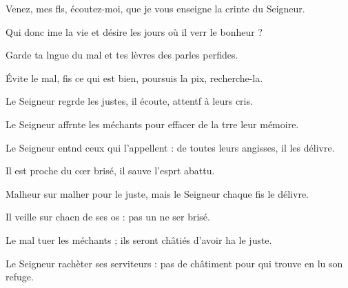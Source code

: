 \item Venez, mes fls, écoutez-moi,\psstar{} que je vous enseigne la crinte du Seigneur.
\item Qui donc ime la vie\psstar{} et désire les jours où il verr le bonheur ?
\item Garde ta lngue du mal\psstar{} et tes lèvres des parles perfides.
\item Évite le mal, fis ce qui est bien,\psstar{} poursuis la pix, recherche-la.
\item Le Seigneur regrde les justes,\psstar{} il écoute, attentf à leurs cris.
\item Le Seigneur affrnte les méchants\psstar{} pour effacer de la trre leur mémoire.
\item Le Seigneur entnd ceux qui l’appellent :\psstar{} de toutes leurs angisses, il les délivre.
\item Il est proche du cœr brisé,\psstar{} il sauve l’esprt abattu.
\item Malheur sur malher pour le juste,\psstar{} mais le Seigneur chaque fis le délivre.
\item Il veille sur chacn de ses os :\psstar{} pas un ne ser brisé.
\item Le mal tuer les méchants ;\psstar{} ils seront châtiés d’avoir ha le juste.
\item Le Seigneur rachèter ses serviteurs :\psstar{} pas de châtiment pour qui trouve en lu son refuge.